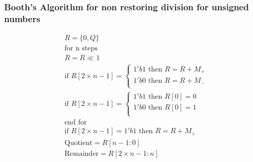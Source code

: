 \begin{frame}
    \frametitle{Booth's Algorithm for non restoring division for unsigned numbers}
    \begin{equation}
        \begin{aligned}
            &R=\{0,Q\}\\
            &\text{for n steps}\\
            &R=R \ll 1\\
            &\text{if } R[2 \times n - 1]=\begin{cases}
                1'b1 \text{ then } R=R+M_{+}\\
                1'b0 \text{ then } R=R+M_{-}\\
            \end{cases}\\
            &\text{if } R[2 \times n - 1]=\begin{cases}
                1'b1 \text{ then } R[0]=0\\
                1'b0 \text{ then } R[0]=1\\
            \end{cases}\\
            &\text{end for}\\
            &\text{if } R[2 \times n - 1]=1'b1 \text{ then } R=R+M_{+}\\
            &\text{Quotient}=R[n-1:0]\\
            &\text{Remainder}=R[2 \times n -1 : n]
        \end{aligned}
    \end{equation}
\end{frame}